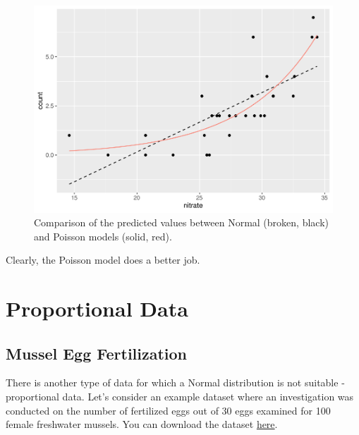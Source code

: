 \documentclass[
]{book}
\begin{document}
\begin{figure}

{\centering \includegraphics{biostats_files/figure-latex/normal-pois-1} 

}

\caption{Comparison of the predicted values between Normal (broken, black) and Poisson models (solid, red).}\label{fig:normal-pois}
\end{figure}

Clearly, the Poisson model does a better job.

\hypertarget{proportional-data}{%
\section{Proportional Data}\label{proportional-data}}

\hypertarget{mussel-egg-fertilization}{%
\subsection{Mussel Egg Fertilization}\label{mussel-egg-fertilization}}

There is another type of data for which a Normal distribution is not suitable - proportional data. Let's consider an example dataset where an investigation was conducted on the number of fertilized eggs out of 30 eggs examined for 100 female freshwater mussels. You can download the dataset \href{https://github.com/aterui/biostats/blob/master/data_raw/data_mussel.csv}{here}.
\end{document}
